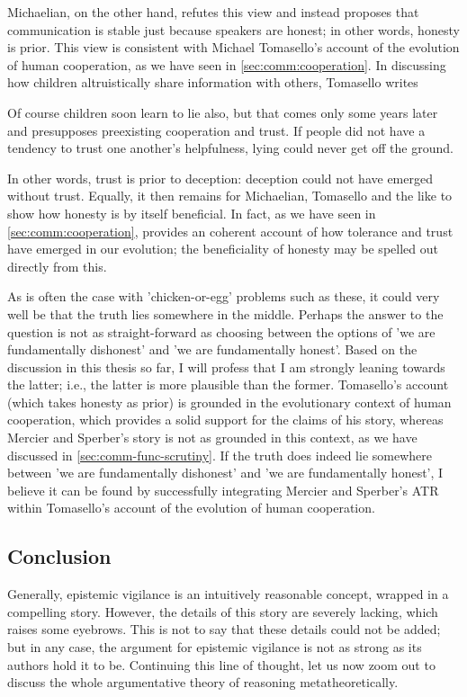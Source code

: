 Michaelian, on the other hand, refutes this view and instead proposes that communication is stable just because speakers are honest; in other words, honesty is prior. This view is consistent with Michael Tomasello's account of the evolution of human cooperation, as we have seen in \cref{sec:comm:cooperation}. In discussing how children altruistically share information with others, Tomasello writes
\begin{quoting}
    Of course children soon learn to lie also, but that comes only some years later and presupposes preexisting cooperation and trust. If people did not have a tendency to trust one another’s helpfulness, lying could never get off the ground.
    \hfill \citep[p.~21]{Tomasello09}
\end{quoting}
In other words, trust is prior to deception: deception could not have emerged without trust.
Equally, it then remains for Michaelian, Tomasello and the like to show how honesty is by itself beneficial. In fact,
as we have seen in \cref{sec:comm:cooperation}, \citet{Tomasello09} provides an coherent account of how tolerance and trust have emerged in our evolution;
the beneficiality of honesty may be spelled out directly from this.

As is often the case with 'chicken-or-egg' problems such as these, it could very well be that the truth lies somewhere in the middle. Perhaps the answer to the question is not as straight-forward as choosing between the options of 'we are fundamentally dishonest' and 'we are fundamentally honest'.
Based on the discussion in this thesis so far, I will profess that I am strongly leaning towards the latter; i.e., the latter is more plausible than the former. Tomasello's account (which takes honesty as prior) is grounded in the evolutionary context of human cooperation, which provides a solid support for the claims of his story,
whereas Mercier and Sperber's story is not as grounded in this context, as we have discussed in \cref{sec:comm-func-scrutiny}.
If the truth does indeed lie somewhere between 'we are fundamentally dishonest' and 'we are fundamentally honest', I believe it can be found by successfully integrating Mercier and Sperber's ATR within Tomasello's account of the evolution of human cooperation.

\subsection{Conclusion}

Generally, epistemic vigilance is an intuitively reasonable concept, wrapped in a compelling story. However, the details of this story are severely lacking, which raises some eyebrows. This is not to say that these details could not be added; but in any case, the argument for epistemic vigilance is not as strong as its authors hold it to be. Continuing this line of thought, let us now zoom out to discuss the whole argumentative theory of reasoning metatheoretically.

